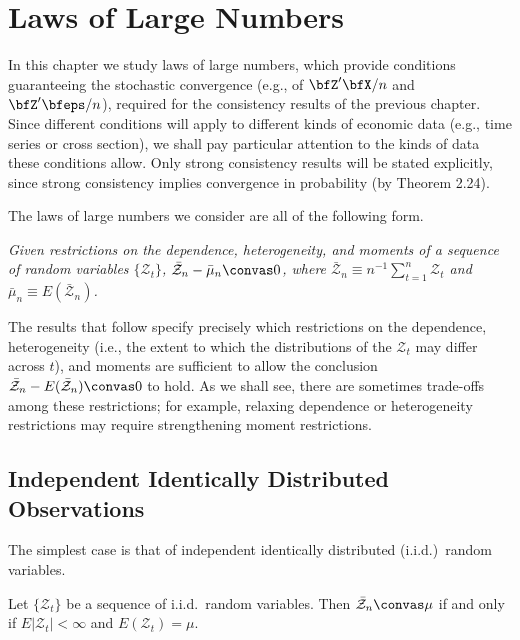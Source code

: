 \chapter{Laws of Large Numbers}\label{ch:lln}

In this chapter we study laws of large numbers, which provide conditions
guaranteeing the stochastic convergence (e.g., of $\bfZ'\bfX/n$ and $\bfZ'\bfeps/n$), required for the consistency results of the previous chapter. Since different conditions will apply to different kinds of economic data (e.g., time series or cross section), we shall pay particular attention to the kinds of data these conditions allow. Only strong consistency results will be stated explicitly, since strong consistency implies convergence in probability (by Theorem 2.24).

The laws of large numbers we consider are all of the following form.

\begin{proposition}\label{prop:lln-form}
\emph{Given restrictions on the dependence, heterogeneity, and moments of a sequence of random variables $\{\mathcal{Z}_t\}$, $\bar{\mathcal{Z}}_n - \bar{\mu}_n \convas 0$, where $\bar{\mathcal{Z}}_n \equiv n^{-1} \sum_{t=1}^{n} \mathcal{Z}_t$ and $\bar{\mu}_n \equiv E(\bar{\mathcal{Z}}_n)$.}
\end{proposition}

The results that follow specify precisely which restrictions on the dependence, heterogeneity (i.e., the extent to which the distributions of the $\mathcal{Z}_t$ may differ across $t$), and moments are sufficient to allow the conclusion $\bar{\mathcal{Z}}_n - E(\bar{\mathcal{Z}}_n) \convas 0$ to hold. As we shall see, there are sometimes trade-offs among these restrictions; for example, relaxing dependence or heterogeneity restrictions may require strengthening moment restrictions.

\section{Independent Identically Distributed Observations}\label{sec:lln-iid}

The simplest case is that of independent identically distributed (i.i.d.)\ random variables.

\begin{theorem}[Kolmogorov]\label{thm:kolmogorov-lln}
Let $\{\mathcal{Z}_t\}$ be a sequence of i.i.d.\ random variables. Then $\bar{\mathcal{Z}}_n \convas \mu$ if and only if $E|\mathcal{Z}_t| < \infty$ and $E(\mathcal{Z}_t) = \mu$.
\end{theorem}

